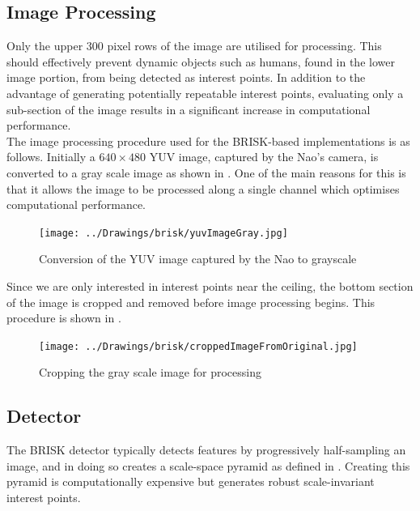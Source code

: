 \subsection{Image Processing}
\label{sec:imageProcessingBrisk}
Only the upper $300$ pixel rows of the image are utilised for processing.  This should effectively prevent dynamic objects such as humans, found in the lower image portion, from being detected as interest points. In addition to the advantage of generating potentially repeatable interest points, evaluating only a sub-section of the image results in a significant increase in computational performance. \\ 

The image processing procedure used for the BRISK-based implementations is as follows. Initially a $640 \times 480$ YUV image, captured by the Nao's camera, is converted to a gray scale image as shown in . One of the main reasons for this is that it allows the image to be processed along a single channel which optimises computational performance. \\

\begin{figure}[h!] 
  \centering
    \texttt{[image: ../Drawings/brisk/yuvImageGray.jpg]}
    \caption{Conversion of the YUV image captured by the Nao to grayscale}
    \label{fig:colourGrayscale}
\end{figure}

Since we are only interested in interest points near the ceiling, the bottom section of the image is cropped and removed before image processing begins. This procedure is shown in .\\

\begin{figure}[h!] 
  \centering
    \texttt{[image: ../Drawings/brisk/croppedImageFromOriginal.jpg]}
    \caption{Cropping the gray scale image for processing}
    \label{fig:cropImage}
\end{figure}

\subsection{Detector}
\label{sec:BRISK0Detect}
The BRISK detector typically detects features by progressively half-sampling an image, and in doing so creates a scale-space pyramid as defined in . Creating this pyramid is computationally expensive but generates robust scale-invariant interest points.\\

